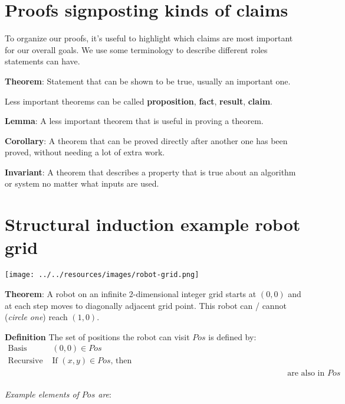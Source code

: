 \documentclass[12pt, oneside]{article}
\begin{document}
\section*{Proofs signposting kinds of claims}


To organize our proofs, it's useful to highlight which claims are most important for 
our overall goals.
We use some terminology to describe different roles statements can have.

{\bf Theorem}: Statement that can be shown to be true, usually an important one.

Less important theorems can be called {\bf proposition}, {\bf fact}, {\bf result}, {\bf claim}.

{\bf Lemma}: A less important theorem that is useful in proving a theorem.
 
{\bf Corollary}: A theorem that can be proved directly after another one has been proved, 
without needing a lot of extra work.

{\bf Invariant}: A theorem that describes a property that is true about an algorithm or 
system no matter what inputs are used.




 \vfill
\section*{Structural induction example robot grid}


\begin{center}
    \texttt{[image: ../../resources/images/robot-grid.png]}
\end{center}
    
{\bf Theorem}: A robot on an infinite 2-dimensional integer grid starts at $(0,0)$ and at each step moves
to diagonally adjacent grid point. This robot can / cannot {\footnotesize({\it circle one})} reach $(1,0)$.


{\bf Definition} The set of positions the robot can visit  $Pos$ is defined by:
\[
\begin{array}{ll}
    \textrm{Basis Step: } & (0,0) \in Pos \\
    \textrm{Recursive Step: } & \textrm{If } (x,y) \in Pos \textrm{, then } \\
    &\phantom{(x+1, y+1), (x+1, y-1), (x-1, y-1), (x-1, y+1)} \textrm{ are also in } Pos
\end{array}
\]

{\it Example elements of $Pos$ are}:
\vspace{20pt}
\end{document}
